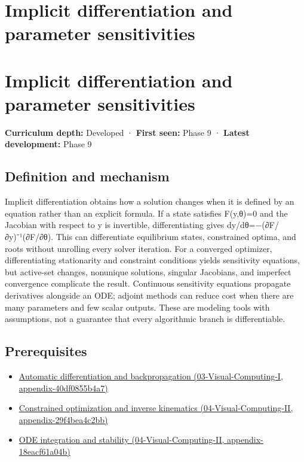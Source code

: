 \hypertarget{appendix-8836553d56fc}{}
\section*{Implicit differentiation and parameter sensitivities}
\section{Implicit differentiation and parameter sensitivities}\label{implicit-differentiation-and-parameter-sensitivities}

\textbf{Curriculum depth:} Developed · \textbf{First seen:} Phase 9 · \textbf{Latest development:} Phase 9

\subsection{Definition and mechanism}\label{definition-and-mechanism}

Implicit differentiation obtains how a solution changes when it is defined by an equation rather than an explicit formula. If a state satisfies F(y,θ)=0 and the Jacobian with respect to y is invertible, differentiating gives dy/dθ=−(∂F/∂y)⁻¹(∂F/∂θ). This can differentiate equilibrium states, constrained optima, and roots without unrolling every solver iteration. For a converged optimizer, differentiating stationarity and constraint conditions yields sensitivity equations, but active-set changes, nonunique solutions, singular Jacobians, and imperfect convergence complicate the result. Continuous sensitivity equations propagate derivatives alongside an ODE; adjoint methods can reduce cost when there are many parameters and few scalar outputs. These are modeling tools with assumptions, not a guarantee that every algorithmic branch is differentiable.

\subsection{Prerequisites}\label{prerequisites}

\begin{itemize}
\tightlist
\item
  \href{}{Automatic differentiation and backpropagation (03-Visual-Computing-I, appendix-40df0855b4a7)}
\item
  \href{}{Constrained optimization and inverse kinematics (04-Visual-Computing-II, appendix-29f4bea4c2bb)}
\item
  \href{}{ODE integration and stability (04-Visual-Computing-II, appendix-18eacf61a04b)}
\end{itemize}


